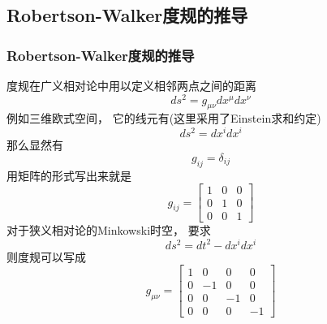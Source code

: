 \documentclass[8pt]{beamer}
\begin{document}
    \subsection{Robertson-Walker度规的推导}
        \begin{frame}[fragile]
            \frametitle{Robertson-Walker度规的推导}

            \begin{multicols}{2} 
                \hypertarget{附录2}{}  
                \qquad   
                度规在广义相对论中用以定义相邻两点之间的距离
                $$ds^2=g_{\mu\nu}dx^{\mu}dx^{\nu}$$
                例如三维欧式空间，
                它的线元有(这里采用了Einstein求和约定)
                $$ds^2=dx^{i}dx^{i}$$
                那么显然有
                $$g_{ij}=\delta_{ij}$$
                用矩阵的形式写出来就是
                $$g_{ij}=
                \begin{bmatrix}
                    1 & 0 & 0\\
                    0 & 1 & 0\\
                    0 & 0 & 1
                \end{bmatrix}
                $$
                对于狭义相对论的Minkowski时空，
                要求
                $$ds^2=dt^2-dx^{i}dx^{i}$$
                则度规可以写成
                $$g_{\mu\nu}=
                \begin{bmatrix}
                    1 & 0 & 0 & 0\\
                    0 & -1& 0 & 0\\
                    0 & 0 & -1& 0\\
                    0 & 0 & 0 & -1
                \end{bmatrix}
                $$
            \end{multicols}
        \end{frame}
\end{document}
